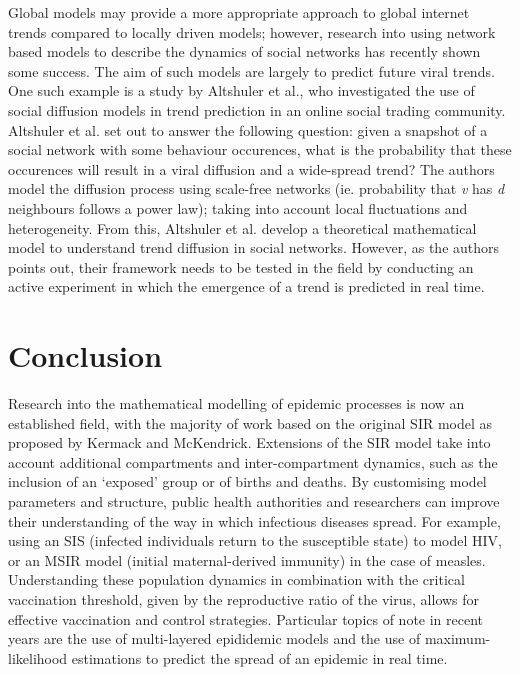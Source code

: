\documentclass[11pt, a4paper, oneside,titlepage]{article}
\begin{document}
Global models may provide a more appropriate approach to global
internet trends compared to locally driven models; however, research
into using network based models to describe the dynamics of social
networks has recently shown some success. The aim of such models are
largely to predict future viral trends. One such example is a study by
Altshuler et al., who investigated the use of social diffusion models
in trend prediction in an online social trading
community.\cite{altshuler} Altshuler et al. set out to answer the
following question: given a snapshot of a social network with some
behaviour occurences, what is the probability that these occurences
will result in a viral diffusion and a wide-spread trend? The authors
model the diffusion process using scale-free networks (ie. probability
that \emph{v} has \emph{d} neighbours follows a power law); taking
into account local fluctuations and heterogeneity. From this,
Altshuler et al. develop a theoretical mathematical model to
understand trend diffusion in social networks. However, as the authors
points out, their framework needs to be tested in the field by
conducting an active experiment in which the emergence of a trend is
predicted in real time.

\section*{Conclusion}
Research into the mathematical modelling of epidemic processes is now
an established field, with the majority of work based on the original
SIR model as proposed by Kermack and McKendrick.\cite{kermack}
Extensions of the SIR model take into account additional compartments
and inter-compartment dynamics, such as the inclusion of an `exposed'
group or of births and deaths. By customising model parameters and
structure, public health authorities and researchers can improve their
understanding of the way in which infectious diseases spread. For
example, using an SIS (infected individuals return to the susceptible
state) to model HIV, or an MSIR model (initial maternal-derived
immunity) in the case of measles.\cite{vynnycky} Understanding these
population dynamics in combination with the critical vaccination
threshold, given by the reproductive ratio of the virus, allows for
effective vaccination and control strategies. Particular topics of
note in recent years are the use of multi-layered epididemic models
and the use of maximum-likelihood estimations to predict the spread of
an epidemic in real time. \cite{tizzoni, gefm, white, hall, nishiura}
\end{document}
